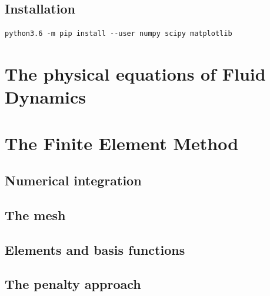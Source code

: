\documentclass[a4paper]{article}
\begin{document}
\subsection{Installation}

\begin{verbatim}
python3.6 -m pip install --user numpy scipy matplotlib
\end{verbatim}



\newpage
\section{The physical equations of Fluid Dynamics}





\newpage
\section{The Finite Element Method}

\subsection{Numerical integration}


\subsection{The mesh}


\subsection{Elements and basis functions}



\subsection{The penalty approach}






\end{document}
